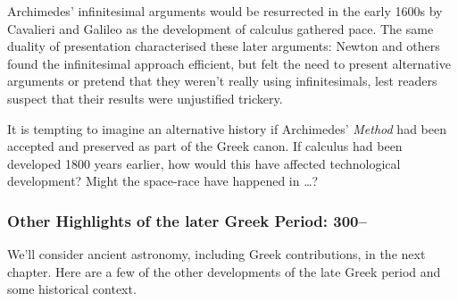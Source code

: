 Archimedes' infinitesimal arguments would be resurrected in the early 1600s by Cavalieri and Galileo as the development of calculus gathered pace. The same duality of presentation characterised these later arguments: Newton and others found the infinitesimal approach efficient, but felt the need to present alternative arguments or pretend that they weren't really using infinitesimals, lest readers suspect that their results were unjustified trickery.
\medbreak

It is tempting to imagine an alternative history if Archimedes' \emph{Method} had been accepted and preserved as part of the Greek canon. If calculus had been developed 1800 years earlier, how would this have affected technological development? Might the space-race have happened in \ldots?




\subsubsection*{Other Highlights of the later Greek Period: 300\BC--}\label{pg:eratosthenes}

We'll consider ancient astronomy, including Greek contributions, in the next chapter. Here are a few of the other developments of the late Greek period and some historical context.

